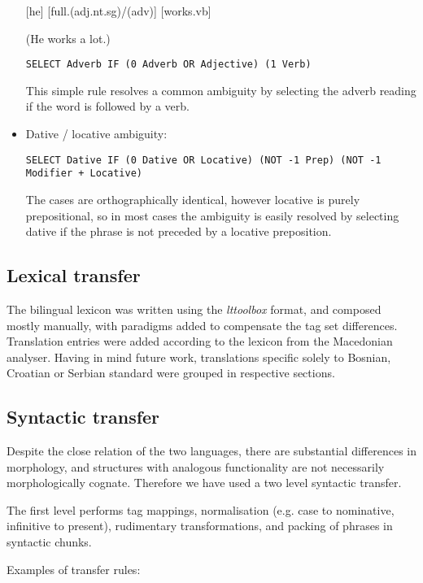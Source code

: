 \documentclass{book}
\begin{document}
\begin{itemize}
{[he] [full{\sc.(adj.nt.sg)/(adv)}] [works{\sc.vb}]

(He works a lot.)
}

\texttt{SELECT Adverb IF (0 Adverb OR Adjective) (1 Verb)}

This simple rule resolves a common ambiguity by selecting the adverb reading if the word is followed by a verb.

\pagebreak 
\item Dative / locative ambiguity:


\texttt{SELECT Dative IF (0 Dative OR Locative) (NOT -1 Prep) (NOT -1 Modifier + Locative)}

The cases are orthographically identical, however locative
is purely prepositional, so in most cases the ambiguity is easily
resolved by selecting dative if the phrase
is not preceded by a locative preposition.

\end{itemize}

\subsection*{Lexical transfer}
The bilingual lexicon was written using the \emph{lttoolbox} format, and composed mostly 
manually, with paradigms added to compensate the tag set differences.
Translation entries were added according to the lexicon from 
the Macedonian analyser. Having in mind future work, translations specific solely 
to Bosnian, Croatian or Serbian standard were grouped in respective sections.

\subsection*{Syntactic transfer}
Despite the close relation of the two languages, there are substantial 
differences in morphology, and structures with analogous functionality 
are not necessarily morphologically cognate. Therefore we have used 
a two level syntactic transfer. 

The first level performs tag mappings, normalisation (e.g. 
case to nominative, infinitive to present), 
rudimentary transformations, and packing of phrases in syntactic chunks. 

Examples of transfer rules:
\end{document}
